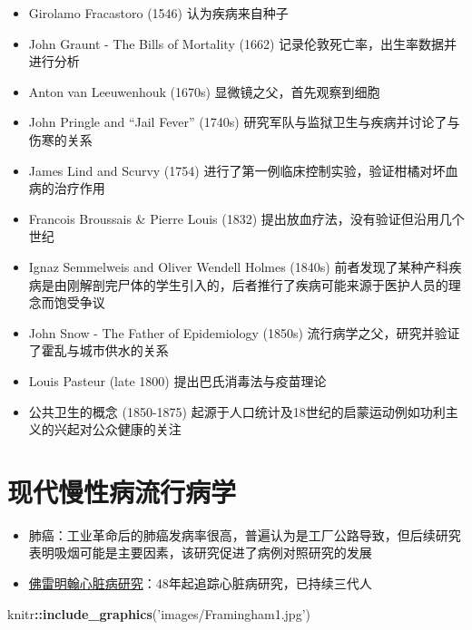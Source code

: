 \documentclass[]{book}
\newenvironment{Shaded}{\begin{snugshade}}{\end{snugshade}}
\newcommand{\KeywordTok}[1]{\textcolor[rgb]{0.13,0.29,0.53}{\textbf{#1}}}
\newcommand{\NormalTok}[1]{#1}
\newcommand{\OperatorTok}[1]{\textcolor[rgb]{0.81,0.36,0.00}{\textbf{#1}}}
\newcommand{\StringTok}[1]{\textcolor[rgb]{0.31,0.60,0.02}{#1}}
\providecommand{\tightlist}{%
  \setlength{\itemsep}{0pt}\setlength{\parskip}{0pt}}
\begin{document}
\begin{itemize}
\tightlist
\item
  Girolamo Fracastoro (1546) 认为疾病来自种子
\item
  John Graunt - The Bills of Mortality (1662) 记录伦敦死亡率，出生率数据并进行分析
\item
  Anton van Leeuwenhouk (1670s) 显微镜之父，首先观察到细胞
\item
  John Pringle and ``Jail Fever'' (1740s) 研究军队与监狱卫生与疾病并讨论了与伤寒的关系
\item
  James Lind and Scurvy (1754) 进行了第一例临床控制实验，验证柑橘对坏血病的治疗作用
\item
  Francois Broussais \& Pierre Louis (1832) 提出放血疗法，没有验证但沿用几个世纪
\item
  Ignaz Semmelweis and Oliver Wendell Holmes (1840s) 前者发现了某种产科疾病是由刚解剖完尸体的学生引入的，后者推行了疾病可能来源于医护人员的理念而饱受争议
\item
  John Snow - The Father of Epidemiology (1850s) 流行病学之父，研究并验证了霍乱与城市供水的关系
\item
  Louis Pasteur (late 1800) 提出巴氏消毒法与疫苗理论
\item
  公共卫生的概念 (1850-1875) 起源于人口统计及18世纪的启蒙运动例如功利主义的兴起对公众健康的关注
\end{itemize}

\section{现代慢性病流行病学}

\begin{itemize}
\tightlist
\item
  肺癌：工业革命后的肺癌发病率很高，普遍认为是工厂公路导致，但后续研究表明吸烟可能是主要因素，该研究促进了病例对照研究的发展
\item
  \href{http://www.framinghamheartstudy.org/}{佛雷明翰心脏病研究}：48年起追踪心脏病研究，已持续三代人
\end{itemize}

\begin{Shaded}
\begin{Highlighting}[]
\NormalTok{knitr}\OperatorTok{::}\KeywordTok{include_graphics}\NormalTok{(}\StringTok{'images/Framingham1.jpg'}\NormalTok{)}
\end{Highlighting}
\end{Shaded}
\end{document}
